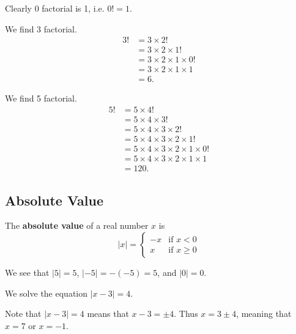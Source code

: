 \begin{example}
    Clearly 0 factorial is 1, i.e. $0! = 1$.
\end{example}

\begin{example}
    We find 3 factorial.
    \begin{align*}
        3! &= 3 \times 2!\\
        &= 3 \times 2 \times 1!\\
        &= 3 \times 2 \times 1 \times 0!\\
        &= 3 \times 2  \times 1  \times 1\\
        &= 6.
    \end{align*}
\end{example}

\begin{example}
    We find 5 factorial.
    \begin{align*}
        5! &= 5 \times 4!\\
        &= 5 \times 4 \times 3!\\
        &= 5 \times 4 \times 3 \times 2!\\
        &= 5 \times 4 \times 3 \times 2 \times 1!\\
        &= 5 \times 4 \times 3 \times 2 \times 1 \times 0!\\
        &= 5 \times 4 \times 3 \times 2  \times 1  \times 1\\
        &= 120.
    \end{align*}
\end{example}

\subsection{Absolute Value}
\begin{definition}
    The \textbf{absolute value} of a real number $x$ is
    \[
        |x| = \begin{cases}
            -x & \text{if } x < 0\\
            x & \text{if } x \geq 0
        \end{cases}
    \]
\end{definition}

\begin{example}
    We see that $|5| = 5$, $|-5| = -(-5) = 5$, and $|0| = 0$.
\end{example}

\begin{example}
    We solve the equation $|x-3| = 4$.

    Note that $|x-3| = 4$ means that $x-3 = \pm 4$. Thus $x = 3 \pm 4$, meaning that $x = 7$ or $x = -1$.
\end{example}

